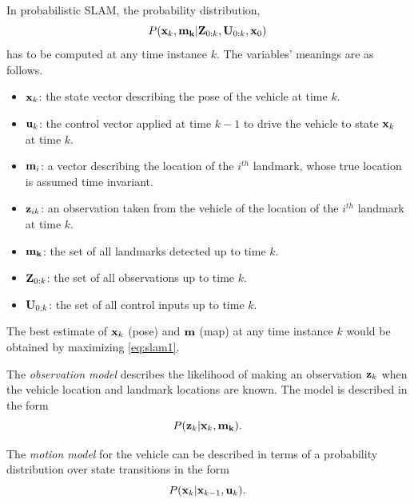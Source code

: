 In probabilistic SLAM, the probability distribution, 
\begin{equation} \label{eq:slam1}
P({\bf x}_{k},{\bf m_k}\vert {\bf Z}_{0:k},{\bf U}_{0:k},{\bf x}_{0})
\end{equation}
has to be computed at any time instance $k$. The variables' meanings are as follows.
\begin{itemize}
	\item ${\bf x}_k$: the state vector describing the pose of the vehicle at time $k$.
	
	\item ${\bf u}_k$: the control vector applied at time $k - 1$ to drive the vehicle to state ${\bf x}_k$ at time $k$.
	
	\item ${\bf m}_i$: a vector describing the location of the $i^{th}$ landmark, whose true location is assumed time invariant.
	
	\item ${\bf z}_{ik}$: an observation taken from the vehicle of the location of the $i^{th}$ landmark at time $k$.
	
	\item ${\bf m_k}$: the set of all landmarks detected up to time $k$.
	
	\item ${\bf Z}_{0:k}$: the set of all observations up to time $k$.
	
	\item ${\bf U}_{0:k}$: the set of all control inputs up to time $k$.
	
\end{itemize}

The best estimate of ${\bf x}_k$ (pose) and ${\bf m}$ (map) at any time instance $k$ would be obtained by maximizing \ref{eq:slam1}.

The \textit{observation model} describes the likelihood of making an observation ${\bf z}_k$ when the vehicle location and landmark locations are known. The model is described in the form
\begin{equation}
P({\bf z}_{k}\vert {\bf x}_{k},{\bf m_k}).
\end{equation}

The \textit{motion model} for the vehicle can be described in terms of a probability distribution over state transitions in the form
\begin{equation}
P({\bf x}_{k}\vert {\bf x}_{k-1},{\bf u}_{k}).
\end{equation}


